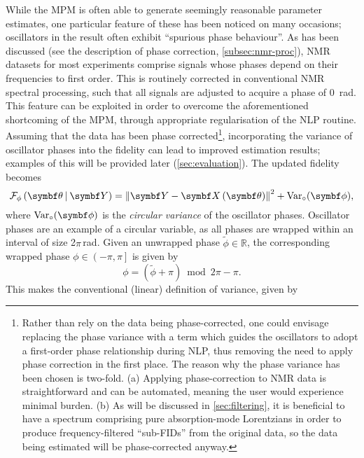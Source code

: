 While the \ac{MPM} is often able to generate seemingly reasonable parameter
estimates,
one particular feature of these has been noticed on many occasions;
oscillators in the result often exhibit ``spurious phase behaviour''.
As has been discussed (see the description of phase correction,
\cref{subsec:nmr-proc}),
\ac{NMR} datasets for most experiments comprise signals whose phases
depend on their frequencies to first order. This is routinely
corrected in conventional \ac{NMR} spectral processing, such that all signals
are adjusted to acquire a phase of \qty{0}{\radian}. This feature
can be exploited in order to overcome the aforementioned shortcoming of
the \ac{MPM}, through appropriate regularisation of the \ac{NLP} routine.
Assuming that the data has been phase corrected\footnote{
    Rather than rely on the data being phase-corrected, one could envisage
    replacing the phase variance with a term which guides the
    oscillators to adopt a first-order phase relationship during \ac{NLP}, thus
    removing the need to apply phase correction in the first place. The
    reason why the
    phase variance has been chosen is two-fold. (a) Applying phase-correction
    to \ac{NMR} data is straightforward and can be automated,
    meaning the user would experience minimal burden. (b) As will be discussed
    in \cref{sec:filtering}, it is beneficial to have a spectrum comprising
    pure absorption-mode Lorentzians in order to produce frequency-filtered
    ``sub-\acp{FID}'' from the original data, so the data being estimated will
    be phase-corrected anyway.
}, incorporating the variance of oscillator
phases into the fidelity can lead to improved estimation results; examples of
this will be provided later (\cref{sec:evaluation}).
The updated fidelity becomes
\begin{equation}
    \FphithY = \left \lVert \bY - \bXth \right \rVert^2 + \circvar,
    \label{eq:fidelity-phasevar}
\end{equation}
where $\circvar$ is the \emph{circular variance} of the oscillator phases.
Oscillator phases are an example of a circular variable, as all
phases are wrapped within an interval of size 2$\pi$\,\unit{\radian}. Given an
unwrapped phase $\widetilde{\phi} \in \mathbb{R}$, the
corresponding wrapped phase $\phi \in \left( -\pi, \pi \right]$ is given by
\begin{equation}
    \phi = (\widetilde{\phi} + \pi) \bmod 2 \pi - \pi.
    \label{eq:phase_wrap}
\end{equation}
This makes the conventional (linear)
definition of variance, given by

